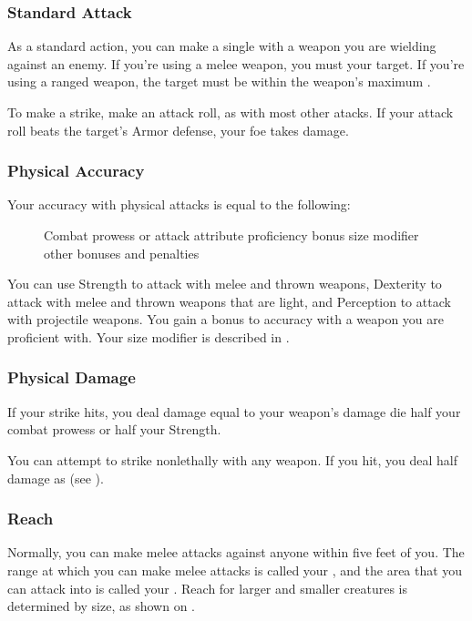         \subsubsection{Standard Attack}\label{Standard Attack}
            As a standard action, you can make a single  with a weapon you are wielding against an enemy.
            If you're using a melee weapon, you must  your target.
            If you're using a ranged weapon, the target must be within the weapon's maximum .

            To make a strike, make an attack roll, as with most other atacks.
            If your attack roll beats the target's Armor defense, your foe takes damage.

        \subsubsection{Physical Accuracy}\label{Physical Accuracy}
            Your accuracy with physical attacks is equal to the following:

            \begin{figure}[h]
                \centering Combat prowess or attack attribute \add proficiency bonus \add size modifier \add other bonuses and penalties
            \end{figure}

             You can use Strength to attack with melee and thrown weapons, Dexterity to attack with melee and thrown weapons that are light, and Perception to attack with projectile weapons.
             You gain a  bonus to accuracy with a weapon you are proficient with.
             Your size modifier is described in .

        \subsubsection{Physical Damage}\label{Physical Damage}
            If your strike hits, you deal damage equal to your weapon's damage die \add half your combat prowess or half your Strength.

             You can attempt to strike nonlethally with any weapon.
            If you hit, you deal half damage as  (see ).

        \subsubsection{Reach}\label{Reach}
            Normally, you can make melee attacks against anyone within five feet of you.
            The range at which you can make melee attacks is called your , and the area that you can attack into is called your .
            Reach for larger and smaller creatures is determined by size, as shown on .

